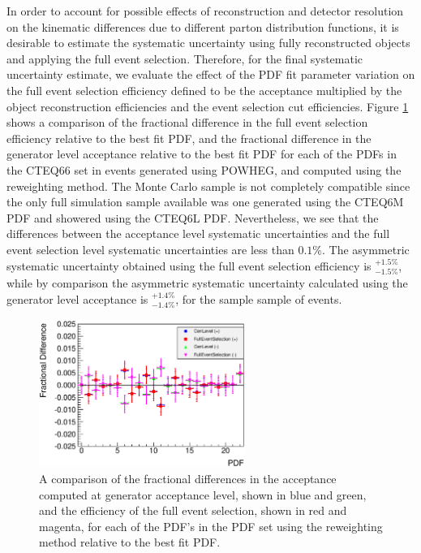 \documentclass{cmspaper}
\begin{document}
In order to account for possible effects of reconstruction and detector resolution on the kinematic differences due to different parton distribution functions, it is desirable to estimate the systematic uncertainty using fully reconstructed objects and applying the full event selection. Therefore, for the final systematic uncertainty estimate, we evaluate the effect of the PDF fit parameter variation on the full event selection efficiency defined to be the acceptance multiplied by the object reconstruction efficiencies and the event selection cut efficiencies. Figure \ref{fig:PDFSystematicsFullEventSelection} shows a comparison of the fractional difference in the full event selection efficiency relative to the best fit PDF, and the fractional difference in the generator level acceptance relative to the best fit PDF for each of the PDFs in the CTEQ66 set in events generated using POWHEG, and computed using the reweighting method. The Monte Carlo sample is not completely compatible since the only full simulation sample available was one generated using the CTEQ6M PDF and showered using the CTEQ6L PDF. Nevertheless, we see that the differences between the acceptance level systematic uncertainties and the full event selection level systematic uncertainties are less than $0.1\%$. The asymmetric systematic uncertainty obtained using the full event selection efficiency is $^{+1.5\%}_{-1.5\%}$, while by comparison the asymmetric systematic uncertainty calculated using the generator level acceptance is $^{+1.4\%}_{-1.4\%}$, for the sample sample of events.

\begin{figure}[htb]
  \begin{center}
    \includegraphics[width=0.60\textwidth]{plots/PDFSystematics_GenLevelVsFullEventSelection_CTEQ66_s09-zeem20-7-mc3.eps} 
    \caption{A comparison of the fractional differences in the acceptance computed at generator acceptance level, shown in blue and green, and the efficiency of the full event selection, shown in red and magenta, for each of the PDF's in the PDF set using the reweighting method relative to the best fit PDF. }
    \label{fig:PDFSystematicsFullEventSelection}
  \end{center}
\end{figure}
\end{document}
